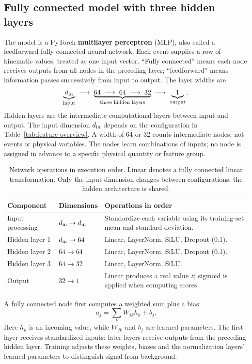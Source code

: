 \documentclass[11pt,a4paper]{article}
\begin{document}
\subsection{Fully connected model with three hidden layers}\label{sec:network}
The model is a PyTorch \textbf{multilayer perceptron} (MLP), also called a feedforward fully connected neural network.
Each event supplies a row of kinematic values, treated as one input vector.
``Fully connected'' means each node receives outputs from all nodes in the preceding layer; ``feedforward'' means information passes successively from input to output.
The layer widths are
\[
 \underbrace{d_{\rm in}}_{\text{input}}
 \;\longrightarrow\;
 \underbrace{64\;\longrightarrow\;64\;\longrightarrow\;32}_{\text{three hidden layers}}
 \;\longrightarrow\;
 \underbrace{1}_{\text{output}}.
\]
Hidden layers are the intermediate computational layers between input and output.
The input dimension $d_{\rm in}$ depends on the configuration in Table~\ref{tab:feature-overview}.
A width of 64 or 32 counts intermediate nodes, not events or physical variables.
The nodes learn combinations of inputs; no node is assigned in advance to a specific physical quantity or feature group.

\begin{table}[H]
\caption{Network operations in execution order. Linear denotes a fully connected linear transformation. Only the input dimension changes between configurations; the hidden architecture is shared.}
\label{tab:network}
\centering\small
\begin{tabularx}{\linewidth}{@{}p{.18\linewidth}p{.19\linewidth}Y@{}}
\toprule
Component & Dimensions & Operations in order \\
\midrule
Input processing & $d_{\rm in}\to d_{\rm in}$ & Standardize each variable using its training-set mean and standard deviation. \\
Hidden layer 1 & $d_{\rm in}\to64$ & Linear, LayerNorm, SiLU, Dropout (0.1). \\
Hidden layer 2 & $64\to64$ & Linear, LayerNorm, SiLU, Dropout (0.1). \\
Hidden layer 3 & $64\to32$ & Linear, LayerNorm, SiLU. \\
Output & $32\to1$ & Linear produces a real value $z$; sigmoid is applied when computing scores. \\
\bottomrule
\end{tabularx}
\end{table}
A fully connected node first computes a weighted sum plus a bias:
\[
 a_j=\sum_k W_{jk}h_k+b_j.
\]
Here $h_k$ is an incoming value, while $W_{jk}$ and $b_j$ are learned parameters.
The first layer receives standardized inputs; later layers receive outputs from the preceding hidden layer.
Training adjusts these weights, biases and the normalization layers' learned parameters to distinguish signal from background.
\end{document}
